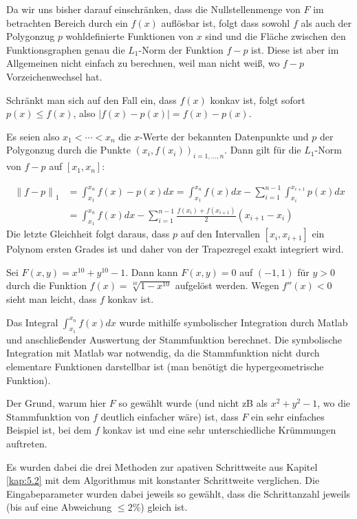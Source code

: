 \documentclass[a4paper,11pt,bibliography=totoc,listof=totoc,headinclude=true,cleardoublepage=empty,oneside]{scrartcl}
\newcommand{\norm}[2]{\left\| #1 \right\|_{#2}}
\begin{document}
Da wir uns bisher darauf einschränken, dass die Nullstellenmenge von $F$ im betrachten Bereich durch ein $f(x)$ auflösbar ist, folgt dass sowohl $f$ als auch der Polygonzug $p$ wohldefinierte Funktionen von $x$ sind und die Fläche zwischen den Funktionsgraphen genau die $L_1$-Norm der Funktion $f-p$ ist. Diese ist aber im Allgemeinen nicht einfach zu berechnen, weil man nicht weiß, wo $f-p$ Vorzeichenwechsel hat. 

Schränkt man sich auf den Fall ein, dass $f(x)$ konkav ist, folgt sofort $p(x) \le f(x)$, also $|f(x)-p(x)|=f(x)-p(x)$.

Es seien also $x_1<\cdots < x_n$ die $x$-Werte der bekannten Datenpunkte und $p$ der Polygonzug durch die Punkte $(x_i,f(x_i))_{i=1,\dots,n}$. Dann gilt für die $L_1$-Norm von $f-p$ auf $[x_1,x_n]$:

\begin{align*}
\norm{f-p}{1} &= \int_{x_1}^{x_n}\!\! f(x)-p(x) dx = \int_{x_1}^{x_n}\!\! f(x) dx - \sum_{i=1}^{n-1} \int_{x_i}^{x_{i+1}}\!\! p(x) dx \\
&=  \int_{x_1}^{x_n}\!\! f(x) dx - \sum_{i=1}^{n-1} \frac{f(x_{i})+f(x_{i+1})}{2} (x_{i+1}-x_i)
\end{align*}
Die letzte Gleichheit folgt daraus, dass $p$ auf den Intervallen $[x_i,x_{i+1}]$ ein Polynom ersten Grades ist und daher von der Trapezregel exakt integriert wird. 

Sei $F(x,y)= x^{10} +y^{10}-1$. Dann kann $F(x,y)=0$ auf $(-1,1)$ für $y>0$ durch die Funktion $f(x)= \sqrt[10]{1-x^{10}}$ aufgelöst werden. Wegen $f''(x) <0$ sieht man leicht, dass $f$ konkav ist. 

Das Integral $ \int_{x_1}^{x_n}\!\! f(x) dx$ wurde mithilfe symbolischer Integration durch Matlab und anschließender Auswertung der Stammfunktion berechnet. Die symbolische Integration mit Matlab war notwendig, da die Stammfunktion nicht durch elementare Funktionen darstellbar ist (man benötigt die hypergeometrische Funktion). 

Der Grund, warum hier $F$ so gewählt wurde (und nicht zB als $x^2+y^2-1$, wo die Stammfunktion von $f$ deutlich einfacher wäre) ist, dass $F$ ein sehr einfaches Beispiel ist, bei dem $f$ konkav ist und eine sehr unterschiedliche Krümmungen auftreten. 

Es wurden dabei die drei Methoden zur apativen Schrittweite aus Kapitel \ref{kap:5.2} mit dem Algorithmus mit konstanter Schrittweite verglichen. 
Die Eingabeparameter wurden dabei jeweils so gewählt, dass die Schrittanzahl jeweils (bis auf eine Abweichung $\le 2\%$) gleich ist.
\end{document}
